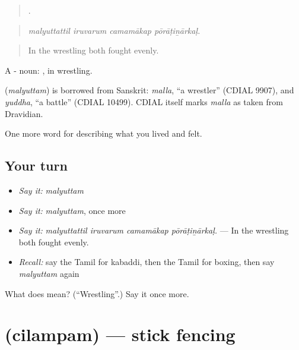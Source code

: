 \begin{quote}
   .
\end{quote}

\begin{quote}
\emph{malyuttattil iruvarum camamākap pōrāṭiṉārkaḷ.}
\end{quote}

\begin{quote}
In the wrestling both fought evenly.
\end{quote}

A - noun: , in wrestling.

\begin{cousinweb}
\textbf{} (\emph{malyuttam}) is borrowed from Sanskrit: \emph{malla}, \textquotedblleft{}a wrestler\textquotedblright{} (CDIAL 9907), and \emph{yuddha}, \textquotedblleft{}a battle\textquotedblright{} (CDIAL 10499). CDIAL itself marks \emph{malla} as taken from Dravidian.
\end{cousinweb}

\begin{grammarlens}[title={What you've built}]
One more word for describing what you lived and felt.
\end{grammarlens}

\subsection*{Your turn}
\begin{itemize}
\raggedright
  \item \emph{Say it:} \emph{malyuttam}
  \item \emph{Say it:} \emph{malyuttam}, once more
  \item \emph{Say it:} \emph{malyuttattil iruvarum camamākap pōrāṭiṉārkaḷ.} — In the wrestling both fought evenly.
  \item \emph{Recall:} say the Tamil for kabaddi, then the Tamil for boxing, then say \emph{malyuttam} again
\end{itemize}

\begin{tcolorbox}[breakable,colback=teal!4,colframe=teal!35!black,title={Before you move on}]
What does  mean? (\textquotedblleft{}Wrestling\textquotedblright{}.) Say it once more.
\end{tcolorbox}
\section[\texorpdfstring{\ta{சிலம்பம்} (cilampam)}{சிலம்பம் (cilampam)}]{ (cilampam) — stick fencing}

